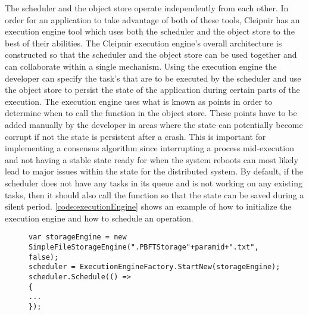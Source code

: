 The scheduler and the object store operate independently from each other. In order for an application to take advantage of both of these tools, Cleipnir has an execution engine tool which uses both the scheduler and the object store to the best of their abilities.
The Cleipnir execution engine's overall architecture is constructed so that the scheduler and the object store can be used together and can collaborate within a single mechanism. Using the execution engine the developer can specify the task's that are to be executed by the scheduler and use the object store to persist the state of the application during certain parts of the execution. The execution engine uses what is known as  points in order to determine when to call the  function in the object store. These points have to be added manually by the developer in areas where the state can potentially become corrupt if not the state is persistent after a crash. This is important for implementing a consensus algorithm since interrupting a process mid-execution and not having a stable state ready for when the system reboots can most likely lead to major issues within the state for the distributed system. By default, if the scheduler does not have any tasks in its queue and is not working on any existing tasks, then it should also call the  function so that the state can be saved during a silent period. \autoref{code:executionEngine} shows an example of how to initialize the execution engine and how to schedule an operation\cite[p.~11]{PAPER:PaxosCleipnir}.

\begin{figure}[H]
	\centering
	\begin{lstlisting}[label = code:executionEngine, caption=Execution engine example, captionpos=b, basicstyle=\scriptsize]
var storageEngine = new SimpleFileStorageEngine(".PBFTStorage"+paramid+".txt", false);
scheduler = ExecutionEngineFactory.StartNew(storageEngine);
scheduler.Schedule(() =>
{
...
});
	\end{lstlisting}
\end{figure}

